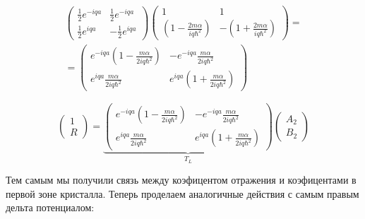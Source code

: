\documentclass[a4paper, 12pt]{article}
\begin{document}
\begin{center}
		\begin{multline*}
			\left(\begin{array}{cc}
				\frac{1}{2}e^{-iqa} & \frac{1}{2}e^{-iqa} \\
				\frac{1}{2}e^{iqa} & -\frac{1}{2}e^{iqa}
			\end{array}\right)
			\left(\begin{array}{cc}
				1 & 1 \\
				\left(1 - \frac{2m\alpha}{iq\hbar^2}\right) & -\left(1 + \frac{2m\alpha}{iq\hbar^2}\right) 
			\end{array}\right) = \\
			= \left(\begin{array}{cc}
				e^{-iqa} \left(1 - \frac{m\alpha}{2iq\hbar^2}\right) & -e^{-iqa}\frac{m\alpha}{2iq\hbar^2} \\
				e^{iqa} \frac{m\alpha}{2iq\hbar^2} & e^{iqa}\left(1+\frac{m\alpha}{2iq\hbar^2} \right)
			\end{array}\right)
		\end{multline*}
	\end{center}
	
	\begin{equation}
		\left(\begin{array}{c}
			1 \\
			R
		\end{array}\right) = \underbrace{\left(\begin{array}{cc}
		e^{-iqa} \left(1 - \frac{m\alpha}{2iq\hbar^2}\right) & -e^{-iqa}\frac{m\alpha}{2iq\hbar^2} \\
		e^{iqa} \frac{m\alpha}{2iq\hbar^2} & e^{iqa}\left(1+\frac{m\alpha}{2iq\hbar^2} \right)
		\end{array}\right) }_{T_L} \left(\begin{array}{c}
			A_2 \\
			B_2 
		\end{array}\right)
	\end{equation}
	
	\quad Тем самым мы получили связь между коэфицентом отражения и коэфицентами в первой зоне кристалла. Теперь проделаем аналогичные действия с самым правым дельта потенциалом: 
\end{document}
